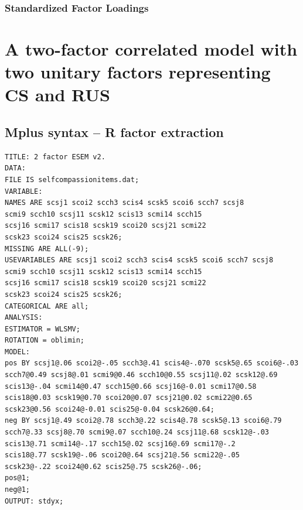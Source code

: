 \documentclass[
  english,
  man,floatsintext]{apa7}
\begin{document}
\begin{appendix}
\newpage

\hypertarget{standardized-factor-loadings}{%
\subsubsection{Standardized Factor
Loadings}\label{standardized-factor-loadings}}



\newpage

\hypertarget{a-two-factor-correlated-model-with-two-unitary-factors-representing-cs-and-rus-1}{%
\section{A two-factor correlated model with two unitary factors
representing CS and
RUS}\label{a-two-factor-correlated-model-with-two-unitary-factors-representing-cs-and-rus-1}}

\hypertarget{mplus-syntax-r-factor-extraction}{%
\subsection{Mplus syntax -- R factor
extraction}\label{mplus-syntax-r-factor-extraction}}

\begin{verbatim}
TITLE: 2 factor ESEM v2.
DATA:
FILE IS selfcompassionitems.dat;
VARIABLE:
NAMES ARE scsj1 scoi2 scch3 scis4 scsk5 scoi6 scch7 scsj8 
scmi9 scch10 scsj11 scsk12 scis13 scmi14 scch15 
scsj16 scmi17 scis18 scsk19 scoi20 scsj21 scmi22 
scsk23 scoi24 scis25 scsk26; 
MISSING ARE ALL(-9);
USEVARIABLES ARE scsj1 scoi2 scch3 scis4 scsk5 scoi6 scch7 scsj8 
scmi9 scch10 scsj11 scsk12 scis13 scmi14 scch15 
scsj16 scmi17 scis18 scsk19 scoi20 scsj21 scmi22 
scsk23 scoi24 scis25 scsk26; 
CATEGORICAL ARE all;
ANALYSIS: 
ESTIMATOR = WLSMV; 
ROTATION = oblimin; 
MODEL:
pos BY scsj1@.06 scoi2@-.05 scch3@.41 scis4@-.070 scsk5@.65 scoi6@-.03 
scch7@0.49 scsj8@.01 scmi9@0.46 scch10@0.55 scsj11@.02 scsk12@.69 
scis13@-.04 scmi14@0.47 scch15@0.66 scsj16@-0.01 scmi17@0.58 
scis18@0.03 scsk19@0.70 scoi20@0.07 scsj21@0.02 scmi22@0.65 
scsk23@0.56 scoi24@-0.01 scis25@-0.04 scsk26@0.64;
neg BY scsj1@.49 scoi2@.78 scch3@.22 scis4@.78 scsk5@.13 scoi6@.79 
scch7@.33 scsj8@.70 scmi9@.07 scch10@.24 scsj11@.68 scsk12@-.03 
scis13@.71 scmi14@-.17 scch15@.02 scsj16@.69 scmi17@-.2 
scis18@.77 scsk19@-.06 scoi20@.64 scsj21@.56 scmi22@-.05 
scsk23@-.22 scoi24@0.62 scis25@.75 scsk26@-.06;
pos@1;
neg@1;
OUTPUT: stdyx;
\end{verbatim}


\end{appendix}
\end{document}

